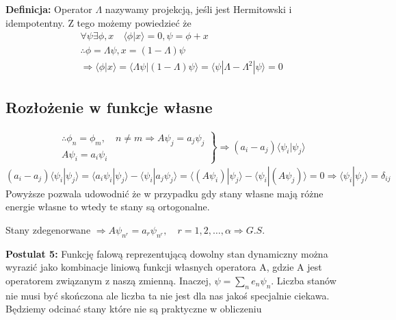 \textbf{Definicja:} Operator $\Lambda$ nazywamy projekcją,
jeśli jest Hermitowski i idempotentny.
Z tego możemy powiedzieć że 
\begin{equation*}
	\begin{split}
		&\forall \psi \exists \phi, x \quad \langle \phi | x \rangle = 0, \psi = \phi + x \\
		&\therefore \phi = \Lambda \psi, x = (1 - \Lambda) \psi  \\
		&\Rightarrow \langle \phi | x \rangle = \langle \Lambda \psi | (1 - \Lambda) \psi \rangle =  \langle  \psi | \Lambda - \Lambda^2 | \psi \rangle = 0 
	\end{split}
\end{equation*}
\subsection{Rozłożenie w funkcje własne}
\begin{align*}
	&\left.
	\begin{aligned}
		\therefore \phi_n = \phi_m, \quad n \neq m \Rightarrow A \psi_j = a_j \psi_j \\
		A \psi_i = a_i \psi_i
	\end{aligned}
	\right\}
	\Rightarrow (a_i - a_j)\langle \psi_i | \psi_j \rangle 
\end{align*}
\begin{equation}
	(a_i - a_j)\langle \psi_i | \psi_j \rangle  = \langle a_i \psi_i | \psi_j \rangle - \langle \psi_i | a_j \psi_j \rangle = \langle (A \psi_i) | \psi_j \rangle - \langle \psi_i | (A \psi_j) \rangle = 0 \Rightarrow \langle \psi_i | \psi_j \rangle = \delta_{ij}
\end{equation}
Powyższe pozwala udowodnić że w przypadku gdy stany własne mają różne energie własne to wtedy te stany są ortogonalne.

Stany zdegenorwane $\Rightarrow A\psi_{n^r} = a_r \psi_{n^r}, \quad r = 1, 2, \dots, \alpha \Rightarrow G.S. $

\textbf{Postulat 5:} Funkcję falową reprezentującą dowolny stan dynamiczny można wyrazić jako kombinacje liniową funkcji własnych operatora A, gdzie A jest operatorem związanym z naszą zmienną. Inaczej, $\psi = \sum_n e_n \psi_n$. Liczba stanów nie musi być skończona ale liczba ta nie jest dla nas jakoś specjalnie ciekawa. Będziemy odcinać stany które nie są praktyczne w obliczeniu

